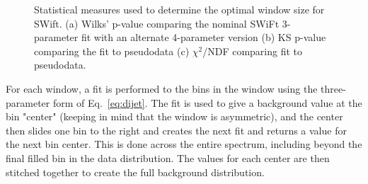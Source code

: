 \begin{figure}[ht!]
	\centering
	\hspace{0.1\textwidth}%
	\caption{Statistical measures used to determine the optimal window size for SWift. (a) Wilks' p-value comparing the nominal SWiFt 3-parameter fit with an alternate 4-parameter version (b) KS p-value comparing the fit to pseudodata (c) $\chi^2$/NDF comparing fit to pseudodata. }
	\label{fig:SwiftFitStats}
\end{figure}

For each window, a fit is performed to the bins in the window using the three-parameter form of Eq.~\ref{eq:dijet}. The fit is used to give a background value at the bin "center" (keeping in mind that the window is asymmetric), and the center then slides one bin to the right and creates the next fit and returns a value for the next bin center.  This is done across the entire spectrum, including beyond the final filled bin in the data distribution.  The values for each center are then stitched together to create the full background distribution.


